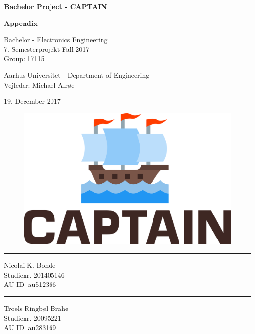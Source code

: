 \begin{titlingpage}
		
	\begin{center}
			{\huge\bfseries Bachelor Project - CAPTAIN}\\
			\vspace{10pt}
			
			{\Huge\bfseries Appendix}\\
			
			\vspace{20pt}
			
			{Bachelor - Electronics Engineering}\\
			{\large 7. Semesterprojekt Fall 2017}\\
			{Group: 17115}
			
			\vspace{10pt}
			
			Aarhus Universitet - Department of Engineering\\
			Vejleder: Michael Alrøe
			\vspace{10pt}
			
			19. December 2017
			\vspace{10pt}
			\begin{figure}[H]
				\centering
				\includegraphics[max width=0.7\linewidth]{Images/logo.png}
			\end{figure}
			\vspace{50pt}
			\begin{minipage}{0.25\linewidth}
				\centering
				\hrule
				\vspace{12pt}
				Nicolai K. Bonde\\
				Studienr. 201405146\\
				AU ID: au512366
			\end{minipage}
			\hspace{50pt}
			\begin{minipage}{0.25\linewidth}
				\centering
				\hrule
				\vspace{12pt}
				Troels Ringbøl Brahe\\
				Studienr. 20095221\\
				AU ID: au283169
			\end{minipage}
	\end{center}
\end{titlingpage}